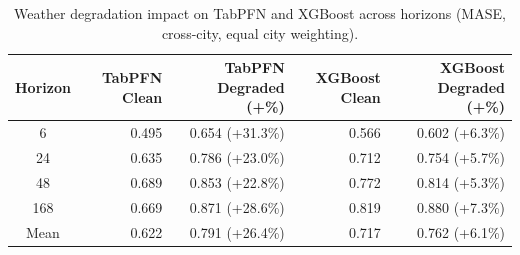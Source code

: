 \begin{table}
\centering
\caption{Weather degradation impact on TabPFN and XGBoost across horizons (MASE, cross-city, equal city weighting).}
\label{tab:degradation_tabpfn_xgboost_by_horizon}
\begin{tabular}{crrrr}
\toprule
Horizon & TabPFN Clean & TabPFN Degraded (+\%) & XGBoost Clean & XGBoost Degraded (+\%) \\
\midrule
6 & 0.495 & 0.654 (+31.3\%) & 0.566 & 0.602 (+6.3\%) \\
24 & 0.635 & 0.786 (+23.0\%) & 0.712 & 0.754 (+5.7\%) \\
48 & 0.689 & 0.853 (+22.8\%) & 0.772 & 0.814 (+5.3\%) \\
168 & 0.669 & 0.871 (+28.6\%) & 0.819 & 0.880 (+7.3\%) \\
\midrule
Mean & 0.622 & 0.791 (+26.4\%) & 0.717 & 0.762 (+6.1\%) \\
\bottomrule
\end{tabular}
\end{table}
